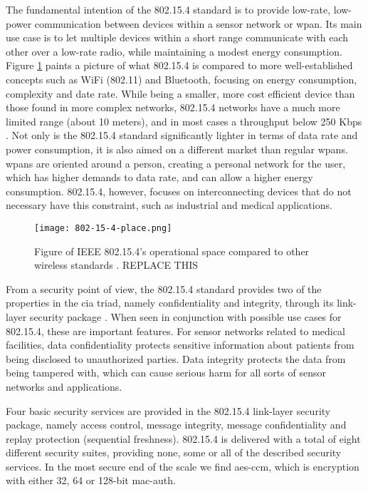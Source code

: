 The fundamental intention of the 802.15.4 standard is to provide low-rate, low-power communication between devices within a sensor network or \gls{wpan}. Its main use case is to let multiple devices within a short range communicate with each other over a low-rate radio, while maintaining a modest energy consumption. Figure \ref{fig:802154-figure} paints a picture of what 802.15.4 is compared to more well-established concepts such as WiFi (802.11) and Bluetooth, focusing on energy consumption, complexity and date rate. While being a smaller, more cost efficient device than those found in more complex networks, 802.15.4 networks have a much more limited range (about 10 meters), and in most cases a throughput below 250 Kbps \cite{gutierrez2001ieee}. Not only is the 802.15.4 standard significantly lighter in terms of data rate and power consumption, it is also aimed on a different market than regular \gls{wpan}s. \gls{wpan}s are oriented around a person, creating a personal network for the user, which has higher demands to data rate, and can allow a higher energy consumption. 802.15.4, however, focuses on interconnecting devices that do not necessary have this constraint, such as industrial and medical applications. 

\begin{figure}
	\centering
	\texttt{[image: 802-15-4-place.png]}
	\caption{Figure of IEEE 802.15.4's operational space compared to other wireless standards \cite{gutierrez2001ieee}. REPLACE THIS}
	\label{fig:802154-figure}
\end{figure}


From a security point of view, the 802.15.4 standard provides two of the properties in the \gls{cia} triad, namely confidentiality and integrity, through its link-layer security package \cite{sastry2004security}. When seen in conjunction with possible use cases for 802.15.4, these are important features. For sensor networks related to medical facilities, data confidentiality protects sensitive information about patients from being disclosed to unauthorized parties. Data integrity protects the data from being tampered with, which can cause serious harm for all sorts of sensor networks and applications.


Four basic security services are provided in the 802.15.4 link-layer security package, namely access control, message integrity, message confidentiality and replay protection (sequential freshness). 802.15.4 is delivered with a total of eight different security suites, providing none, some or all of the described security services. In the most secure end of the scale we find \gls{aes}-\gls{ccm}, which is encryption with either 32, 64 or 128-bit \gls{mac-auth}. 

